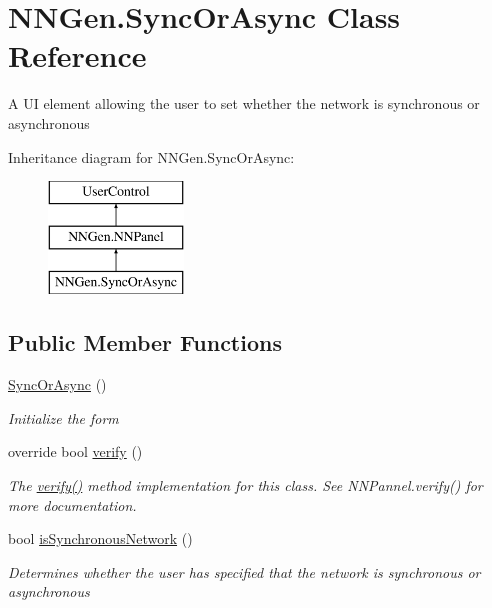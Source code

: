 \hypertarget{class_n_n_gen_1_1_sync_or_async}{}\section{N\+N\+Gen.\+Sync\+Or\+Async Class Reference}
\label{class_n_n_gen_1_1_sync_or_async}


A U\+I element allowing the user to set whether the network is synchronous or asynchronous  


Inheritance diagram for N\+N\+Gen.\+Sync\+Or\+Async\+:\begin{figure}[H]
\begin{center}
\leavevmode
\includegraphics[height=3.000000cm]{class_n_n_gen_1_1_sync_or_async}
\end{center}
\end{figure}
\subsection*{Public Member Functions}
\begin{DoxyCompactItemize}
\item 
\hyperlink{class_n_n_gen_1_1_sync_or_async_a39ad84feadeb6aa5f66a932c6679f4e3}{Sync\+Or\+Async} ()
\begin{DoxyCompactList}\small\item\em Initialize the form \end{DoxyCompactList}\item 
override bool \hyperlink{class_n_n_gen_1_1_sync_or_async_a43e1723039a0485fe09f6f374eb48620}{verify} ()
\begin{DoxyCompactList}\small\item\em The \hyperlink{class_n_n_gen_1_1_sync_or_async_a43e1723039a0485fe09f6f374eb48620}{verify()} method implementation for this class. See N\+N\+Pannel.\+verify() for more documentation. \end{DoxyCompactList}\item 
bool \hyperlink{class_n_n_gen_1_1_sync_or_async_ad9f608f2c61cc51ad7abc68961bfffb1}{is\+Synchronous\+Network} ()
\begin{DoxyCompactList}\small\item\em Determines whether the user has specified that the network is synchronous or asynchronous \end{DoxyCompactList}\end{DoxyCompactItemize}
